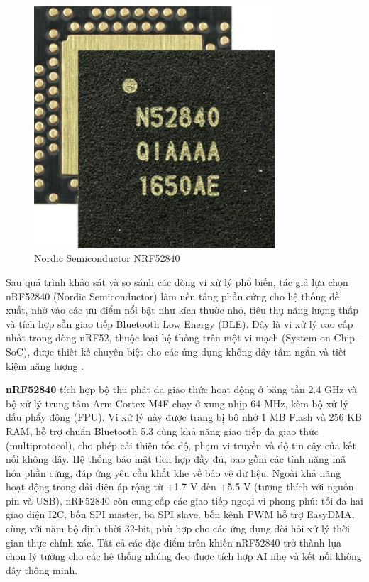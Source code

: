 \begin{figure}[htbp]
		\centering
 		\includegraphics[width=0.8\textwidth]{images/NRF52840-QFA_SPL.jpg}
		\caption{Nordic Semiconductor NRF52840}
		\label{Nordic}
\end{figure}
Sau quá trình khảo sát và so sánh các dòng vi xử lý phổ biến, tác giả 
lựa chọn nRF52840 (Nordic Semiconductor) làm nền tảng phần cứng cho hệ 
thống đề xuất, nhờ vào các ưu điểm nổi bật như kích thước nhỏ, 
tiêu thụ năng lượng thấp và tích hợp sẵn giao tiếp Bluetooth Low Energy 
(BLE). Đây là vi xử lý cao cấp nhất trong dòng nRF52, thuộc loại hệ thống 
trên một vi mạch (System-on-Chip – SoC), được thiết kế chuyên biệt cho 
các ứng dụng không dây tầm ngắn và tiết kiệm năng lượng \cite{nrf52840}.

\textbf{nRF52840} tích hợp bộ thu phát đa giao thức hoạt động ở băng tần 2.4 GHz 
và bộ xử lý trung tâm Arm Cortex-M4F chạy ở xung nhịp 64 MHz, 
kèm bộ xử lý dấu phẩy động (FPU). Vi xử lý này được trang bị bộ nhớ 
1 MB Flash và 256 KB RAM, hỗ trợ chuẩn Bluetooth 5.3 cùng khả năng giao 
tiếp đa giao thức (multiprotocol), cho phép cải thiện tốc độ, phạm vi 
truyền và độ tin cậy của kết nối không dây. Hệ thống bảo mật tích hợp 
đầy đủ, bao gồm các tính năng mã hóa phần cứng, đáp ứng yêu cầu khắt khe 
về bảo vệ dữ liệu. Ngoài khả năng hoạt động trong dải điện áp rộng 
từ +1.7 V đến +5.5 V (tương thích với nguồn pin và USB), nRF52840 còn 
cung cấp các giao tiếp ngoại vi phong phú: tối đa hai giao diện I2C, 
bốn SPI master, ba SPI slave, bốn kênh PWM hỗ trợ EasyDMA, cùng với 
năm bộ định thời 32-bit, phù hợp cho các ứng dụng đòi hỏi xử lý thời 
gian thực chính xác. Tất cả các đặc điểm trên khiến nRF52840 trở thành 
lựa chọn lý tưởng cho các hệ thống nhúng đeo được tích hợp AI nhẹ và 
kết nối không dây thông minh.

